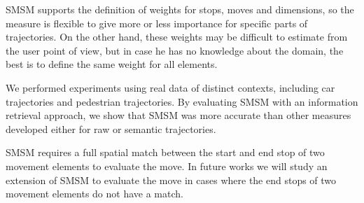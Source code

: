 \documentclass[12pt]{article}
\begin{document}
SMSM supports the definition of weights for stops, moves and dimensions, so the measure is flexible to give more or less importance for specific parts of trajectories. On the other hand, these weights may be difficult to estimate from the user point of view, but in case he has no knowledge about the domain, the best is to define the same weight for all elements.

We performed experiments using real data of distinct contexts, including car trajectories and pedestrian trajectories. By evaluating SMSM with an information retrieval approach, we show that SMSM was more accurate than other measures developed either for raw or semantic trajectories.

SMSM requires a full spatial match between the start and end stop of two movement elements to evaluate the move. In future works we will study an extension of SMSM to evaluate the move in cases where the end stops of two movement elements do not have a match.



\end{document}
